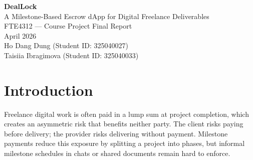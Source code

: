 \documentclass[12pt,a4paper]{article}
\begin{document}
\begin{titlepage}
  \centering
  \vspace*{1.2cm}
  {\LARGE \textbf{DealLock}\\[6pt]}
  {\large A Milestone-Based Escrow dApp for Digital Freelance Deliverables\\[0.8cm]}
  {\normalsize FTE4312 --- Course Project Final Report\\[0.4cm]}
  {\normalsize April 2026\\[1.2cm]}
  {\normalsize
    Ho Dang Dung (Student ID: 325040027)\\[0.25cm]
    Taisiia Ibragimova (Student ID: 325040033)\\[0.45cm]
  }
  \vfill
  \begin{abstract}
    \noindent
    DealLock is a browser-native dApp for milestone-based escrow in structured
    digital freelance agreements. One Solidity contract represents one agreement
    between a client and a provider, holding native ETH and enforcing acceptance,
    exact funding, sequential submission, approval, and refund of expired pending
    milestones. The React/Vite frontend uses wagmi and viem to deploy and operate
    contracts on Sepolia, while optional titles, notes, and agreement history stay
    in browser \texttt{localStorage}. Evaluation is based on an eleven-case
    Hardhat test suite covering the reachable contract state transitions and a
    Sepolia-oriented demo workflow. The project is intentionally scoped as an MVP:
    it enforces payment flow, not subjective quality judgement or arbitration.
  \end{abstract}
\end{titlepage}

\begingroup
\singlespacing
\setlength{\parskip}{0pt}
\tableofcontents
\endgroup
\clearpage

\section{Introduction}

Freelance digital work is often paid in a lump sum at project completion, which
creates an asymmetric risk that benefits neither party.
The client risks paying before delivery; the provider risks delivering without
payment. Milestone payments reduce this exposure by splitting a project into
phases, but informal milestone schedules in chats or shared documents remain
hard to enforce.
\end{document}
